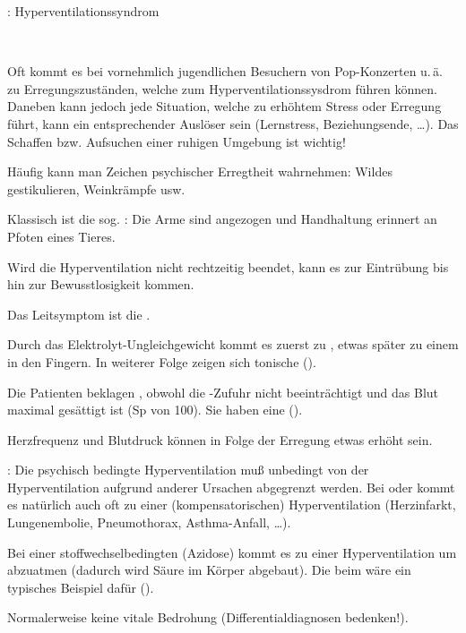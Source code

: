 \documentclass[
ngerman,
paper=a4,
asymmetric,
fontsize=10pt,
draft=false,
numbers=noenddot,
bibtotocnumbered,
footnotes=multiple,
]{scrreprt}
\newcommand{\jNEU}{\vspace{6pt}\noindent{\color{green}\sffamily\textbf{ADDED}\hrulefill\newline}}
\begin{document}
\jNEU
  
{\TxABCDE: Hyperventilationssyndrom}
{~
\begin{ABCDEText}
  \item[\ABCDE{1}] Oft kommt es bei vornehmlich
  jugendlichen Besuchern von Pop-Konzerten u.\,ä. zu
  Erregungszuständen, welche zum Hyperventilationssysdrom
  führen können. Daneben kann jedoch jede Situation, welche
  zu erhöhtem Stress oder Erregung führt, kann ein
  entsprechender Auslöser sein (Lernstress, Beziehungsende,
  \ldots). Das Schaffen bzw. Aufsuchen einer ruhigen
  Umgebung ist wichtig!
  \item[\ABCDE{2}] Häufig kann man Zeichen psychischer
  Erregtheit wahrnehmen: Wildes gestikulieren, Weinkrämpfe
  usw.
  
  Klassisch ist die sog. :
  Die Arme sind angezogen und Handhaltung erinnert an Pfoten eines Tieres.
  \item[\ABCDE{3}] Wird die Hyperventilation nicht
  rechtzeitig beendet, kann es zur Eintrübung bis hin zur Bewusstlosigkeit kommen.
  \item[\ABCDE{4}] Das Leitsymptom ist die .
  
  Durch
  das Elektrolyt-Ungleichgewicht kommt es zuerst zu
  , etwas später zu einem
   in den
  Fingern. In weiterer Folge zeigen sich tonische 
  ().
  \item[\ABCDE{B}]  Die Patienten beklagen , obwohl die
  -Zufuhr nicht beeinträchtigt und das Blut maximal
  gesättigt ist (Sp von 100\PC*). Sie haben eine
   ().
  \item[\ABCDE{C}] Herzfrequenz und Blutdruck können in
  Folge der Erregung etwas erhöht sein.
  \item[\ABCDE{E}] : Die psychisch bedingte
  Hyperventilation muß unbedingt von der Hyperventilation 
  aufgrund anderer Ursachen abgegrenzt
  werden. Bei  oder  kommt es natürlich auch
  oft zu einer (kompensatorischen) Hyperventilation
  (Herzinfarkt, Lungenembolie, Pneumothorax, Asthma-Anfall,
  \ldots).
  
  Bei einer stoffwechselbedingten  (Azidose)
  kommt es zu einer Hyperventilation um  abzuatmen
  (dadurch wird Säure im Körper abgebaut). Die
   beim  wäre
  ein typisches Beispiel dafür
  ().
  \item[\ABCDE{=}] Normalerweise keine vitale Bedrohung
  (Differentialdiagnosen bedenken!).
\end{ABCDEText}
}
\end{document}
